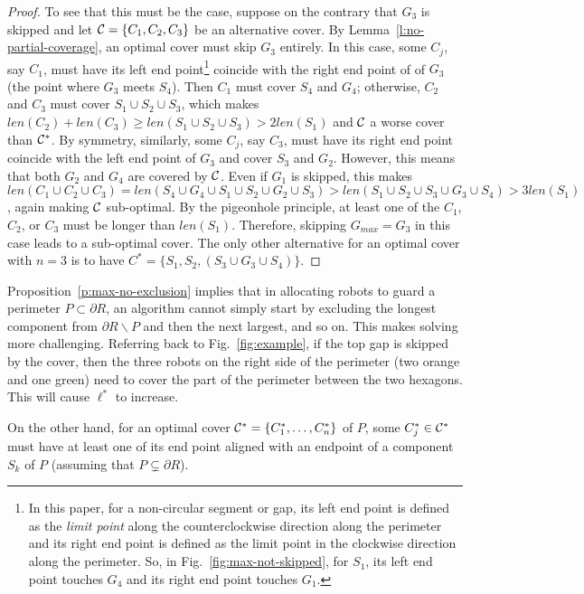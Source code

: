 \begin{proof}
To see that this must be the case, suppose on the contrary that $G_3$ 
is skipped and let $\mathcal C = \{C_1, C_2, C_3\}$ be an alternative cover. 
By Lemma~\ref{l:no-partial-coverage}, an optimal cover must skip $G_3$ 
entirely. In this case, some $C_j$, say $C_1$, must have its left end 
point\footnote{In this paper, for a non-circular segment or gap, its 
left end point is defined as the {\em limit point} along the 
counterclockwise direction along the perimeter and its right end point 
is defined as the limit point in the clockwise direction along the 
perimeter. So, in Fig.~\ref{fig:max-not-skipped}, for $S_1$, its left 
end point touches $G_4$ and its right end point touches $G_1$.} coincide 
with the right end point of of $G_3$ (the point where $G_3$ meets $S_4$). 
Then $C_1$ must cover $S_4$ and $G_4$; otherwise, $C_2$ and $C_3$ must 
cover $S_1 \cup S_2 \cup S_3$, which makes $len(C_2) + len(C_3) \ge 
len(S_1 \cup S_2 \cup S_3) > 2len(S_1)$ and $\mathcal C$ a worse cover than 
$\mathcal C^*$. By symmetry, similarly, some $C_j$, say $C_3$, must have its 
right end point coincide with the left end point of $G_3$ and cover 
$S_3$ and $G_2$. However, this means that both $G_2$ and $G_4$ are 
covered by $\mathcal C$. Even if $G_1$ is skipped, this makes $len(C_1 \cup 
C_2 \cup C_3) = len(S_4 \cup G_4 \cup S_1 \cup S_2 \cup G_2 \cup S_3) 
> len (S_1 \cup S_2 \cup S_3\cup G_3\cup S_4) > 3len(S_1)$, again making
$\mathcal C$ sub-optimal. By the pigeonhole principle, at least one of the $C_1$, 
$C_2$, or $C_3$ must be longer than $len(S_1)$. Therefore, skipping 
$G_{max} = G_3$ in this case leads to a sub-optimal cover. The only 
other alternative for an optimal cover with $n = 3$ is to have $C^* = 
\{S_1, S_2, (S_3\cup G_3\cup S_4)\}$. 
\end{proof}

Proposition~\ref{p:max-no-exclusion} implies that in allocating robots 
to guard a perimeter $P \subset \partial R$, an algorithm cannot simply 
start by excluding the longest component from $\partial R 
\backslash P$ and then the next largest, and so on. This makes solving
\opg more challenging. Referring back to Fig.~\ref{fig:example}, if the 
top gap is skipped by the cover, then the three robots on the right side 
of the perimeter (two orange and one green) need to cover the part of the 
perimeter between the two hexagons. This will cause $\ell^*$ to increase. 

On the other hand, for an optimal cover $\mathcal C^* = \{C_1^*, \ldots, C_n^*\}$ 
of $P$, some $C_j^*\in \mathcal C^*$ must have at least one of its end point 
aligned with an endpoint of a component $S_k$ of $P$ (assuming that $P 
\subsetneq \partial R$). 

